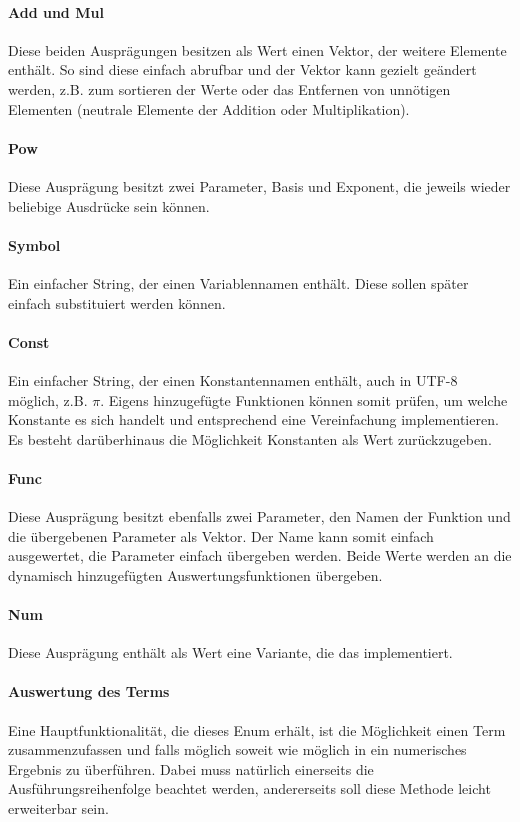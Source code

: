 \documentclass[11pt,a4paper, ngerman]{article}
\begin{document}
\paragraph{Add und Mul} Diese beiden Ausprägungen besitzen als Wert einen Vektor, der weitere Elemente enthält. So sind diese einfach abrufbar und der Vektor kann gezielt geändert werden, z.B. zum sortieren der Werte oder das Entfernen von unnötigen Elementen (neutrale Elemente der Addition oder Multiplikation).

\paragraph{Pow} Diese Ausprägung besitzt zwei Parameter, Basis und Exponent, die jeweils wieder beliebige Ausdrücke sein können.

\paragraph{Symbol} Ein einfacher String, der einen Variablennamen enthält. Diese sollen später einfach substituiert werden können.

\paragraph{Const} Ein einfacher String, der einen Konstantennamen enthält, auch in UTF-8 möglich, z.B. $\pi$. Eigens hinzugefügte Funktionen können somit prüfen, um welche Konstante es sich handelt und entsprechend eine Vereinfachung implementieren. Es besteht darüberhinaus die Möglichkeit Konstanten als Wert zurückzugeben.

\paragraph{Func} Diese Ausprägung besitzt ebenfalls zwei Parameter, den Namen der Funktion und die übergebenen Parameter als Vektor. Der Name kann somit einfach ausgewertet, die Parameter einfach übergeben werden. Beide Werte werden an die dynamisch hinzugefügten Auswertungsfunktionen übergeben.

\paragraph{Num} Diese Ausprägung enthält als Wert eine Variante, die das   implementiert.

\paragraph{Auswertung des Terms} Eine Hauptfunktionalität, die dieses Enum erhält, ist die Möglichkeit einen Term zusammenzufassen und falls möglich soweit wie möglich in ein numerisches Ergebnis zu überführen. Dabei muss natürlich einerseits die Ausführungsreihenfolge beachtet werden, andererseits soll diese Methode leicht erweiterbar sein.
\end{document}
